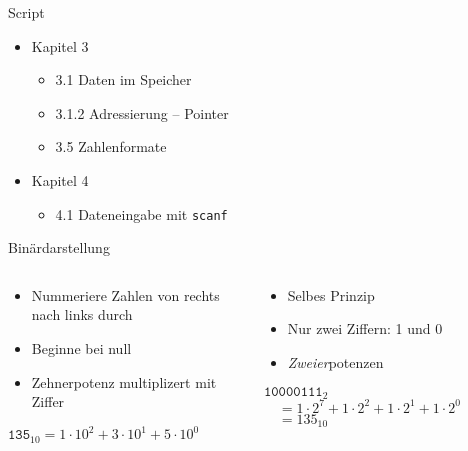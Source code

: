 
\begin{frame}[t,plain]
\titlepage
\end{frame}


\begin{frame}{Script}
%
\begin{itemize}
\item Kapitel 3
	\begin{itemize}
	\item 3.1 Daten im Speicher
	\item 3.1.2 Adressierung – Pointer
	\item 3.5 Zahlenformate
	\end{itemize}
\item Kapitel 4
	\begin{itemize}
	\item 4.1 Dateneingabe mit \texttt{scanf}
	\end{itemize}
\end{itemize}
%
\end{frame}


\begin{frame}[fragile]{Binärdarstellung}
%
\begin{columns}[T]
\begin{tcolorbox}[title=Dezimalzahlen]
\begin{itemize}
\item Nummeriere Zahlen von rechts nach links durch
\item Beginne bei null
\item Zehnerpotenz multiplizert mit Ziffer
\end{itemize}
\begin{codebox}[]
{\scriptsize {}\newline}
$\texttt{135}_{10} = 1 \cdot 10^2 + 3 \cdot 10^1 + 5 \cdot 10^0$
\end{codebox}
\end{tcolorbox}
%
\begin{tcolorbox}[title=Binärzahlen]
\begin{itemize}
\item Selbes Prinzip
\item Nur zwei Ziffern: 1 und 0
\item \emph{Zweier}potenzen
\end{itemize}
\begin{codebox}[]
{\scriptsize {}}\newline
$\texttt{10000111}_{2}$\newline
$\quad   =   1 \cdot 2^7   +   1 \cdot 2^2   +   1 \cdot 2^1   +   1 \cdot 2^0$\newline
$\quad   =   135_{10}$
\end{codebox}
\end{tcolorbox}
\end{columns}
%
\end{frame}

